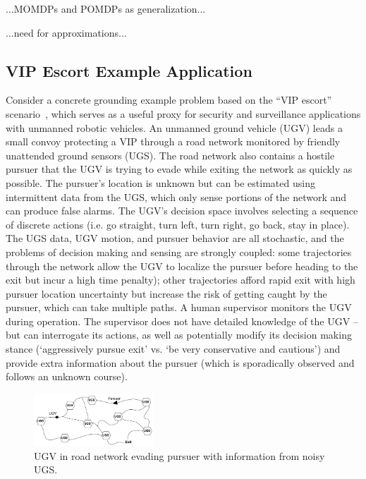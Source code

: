 ...MOMDPs and POMDPs as generalization...

...need for approximations...


\subsection{VIP Escort Example Application} \label{sec:vip_escort}
Consider a concrete grounding example problem based on the ``VIP escort'' scenario~\cite{Humphrey2012-lr}, which %
serves as a useful proxy for security and surveillance applications with unmanned robotic vehicles. An unmanned ground vehicle (UGV) leads a small convoy protecting a VIP through a road network monitored by friendly unattended ground sensors (UGS). The road network also contains a hostile pursuer that the UGV is trying to evade while exiting the network as quickly as possible. The pursuer's location is unknown but can be estimated using intermittent data from the UGS, which only sense portions of the network and can produce false alarms. The UGV's decision space involves selecting a sequence of discrete actions (i.e. go straight, turn left, turn right, go back, stay in place). The UGS data, UGV motion, and pursuer behavior are all stochastic, and the problems of decision making and sensing are strongly coupled: some trajectories through the network allow the UGV to localize the pursuer before heading to the exit but incur a high time penalty); other trajectories afford rapid exit with high pursuer location uncertainty but increase the risk of getting caught by the pursuer, which can take multiple paths. A human supervisor monitors the UGV during operation. The supervisor does not have detailed knowledge of the UGV -- but can interrogate its actions, as well as potentially modify its decision making stance (`aggressively pursue exit' vs. `be very conservative and cautious') and provide extra information about the pursuer (which is sporadically observed and follows an unknown course). 
    
	\begin{figure}[t]%
    	\centering
     	\includegraphics[width=0.4\textwidth]{Figures/RoadNet}
    	\caption{UGV in road network evading pursuer with information from noisy UGS.} 
        \label{fig:RoadNet}
    \end{figure}

